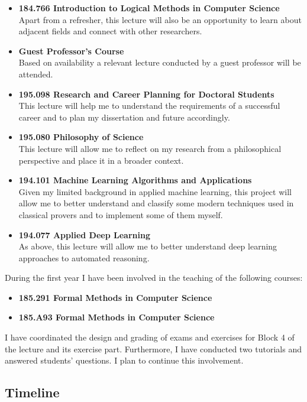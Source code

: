 \documentclass{article}
\theoremstyle{definition}
\theoremstyle{definition}
\theoremstyle{definition}
\theoremstyle{definition}
\theoremstyle{definition}
\theoremstyle{definition}
\theoremstyle{definition}
\newcommand{\0}{\mathbf 0}
\newcommand{\1}{\mathbf 1}
\newcounter{question}
\begin{document}
	\begin{itemize}
		\item\textbf{184.766 Introduction to Logical Methods in Computer Science}\\Apart from a refresher, this lecture will also be an opportunity to learn about adjacent fields and connect with other researchers.
		\item \textbf{Guest Professor’s Course}\\Based on availability a relevant lecture conducted by a guest professor will be attended.
		\item \textbf{195.098 Research and Career Planning for Doctoral Students}\\This lecture will help me to understand the requirements of a successful career and to plan my dissertation and future accordingly.
		\item \textbf{195.080 Philosophy of Science}\\This lecture will allow me to reflect on my research from a philosophical perspective and place it in a broader context.
		\item \textbf{194.101 Machine Learning Algorithms and Applications}\\Given my limited background in applied machine learning, this project will allow me to better understand and classify some modern techniques used in classical provers and to implement some of them myself.
		\item \textbf{194.077 Applied Deep Learning}\\As above, this lecture will allow me to better understand deep learning approaches to automated reasoning.
	\end{itemize}
	During the first year I have been involved in the teaching of the following courses:
	\begin{itemize}
		\item \textbf{185.291 Formal Methods in Computer Science}
		\item \textbf{185.A93 Formal Methods in Computer Science}
	\end{itemize}
	I have coordinated the design and grading of exams and exercises for Block 4 of the lecture and its exercise part. Furthermore, I have conducted two tutorials and answered students' questions. I plan to continue this involvement.

	\subsection{Timeline}
\end{document}
